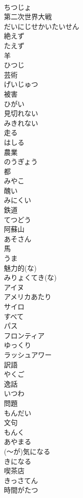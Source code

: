 \documentclass[8pt]{extreport}
\begin{document}
\begin{CJK}{UTF8}{min}
\\	ちつじょ
\\	第二次世界大戦	
\\	だいにじせかいたいせん
\\	絶えず	
\\	たえず
\\	羊	
\\	ひつじ
\\	芸術	
\\	げいじゅつ
\\	被害	
\\	ひがい
\\	見切れない	
\\	みきれない
\\	走る	
\\	はしる
\\	農業	
\\	のうぎょう
\\	都	
\\	みやこ
\\	醜い	
\\	みにくい
\\	鉄道	
\\	てつどう
\\	阿蘇山	
\\	あそさん
\\	馬	
\\	うま
\\	魅力的(な)	
\\	みりょくてき(な)
\\	アイヌ	
\\	アメリカあたり	
\\	サイロ	
\\	すべて	
\\	パス	
\\	フロンティア	
\\	ゆっくり	
\\	ラッシュアワー	
\\	訳語	
\\	やくご
\\	逸話	
\\	いつわ
\\	問題	
\\	もんだい
\\	文句	
\\	もんく
\\	あやまる	
\\	(～が)気になる	
\\	きになる
\\	喫茶店	
\\	きっさてん
\\	時間がたつ	

\end{CJK}
\end{document}
